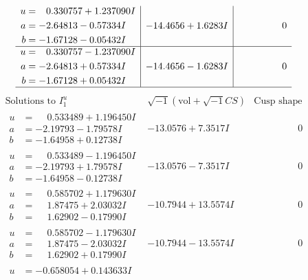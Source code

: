 \documentclass[1p]{elsarticle_modified}
\theoremstyle{definition}
\newcommand{\I}{\sqrt{-1}}
\begin{document}
$$\begin{array}{c|c|c}
\begin{aligned}
u &= \phantom{-}0.330757 + 1.237090 I \\
a &= -2.64813 - 0.57334 I \\
b &= -1.67128 - 0.05432 I\end{aligned}
 & -14.4656 + 1.6283 I & \phantom{-0.000000 } 0 \\ \hline\begin{aligned}
u &= \phantom{-}0.330757 - 1.237090 I \\
a &= -2.64813 + 0.57334 I \\
b &= -1.67128 + 0.05432 I\end{aligned}
 & -14.4656 - 1.6283 I & \phantom{-0.000000 } 0\\
 \hline 
 \end{array}$$\newpage$$\begin{array}{c|c|c}  
\text{Solutions to }I^u_{1}& \I (\text{vol} + \sqrt{-1}CS) & \text{Cusp shape}\\
 \hline 
\begin{aligned}
u &= \phantom{-}0.533489 + 1.196450 I \\
a &= -2.19793 - 1.79578 I \\
b &= -1.64958 + 0.12738 I\end{aligned}
 & -13.0576 + 7.3517 I & \phantom{-0.000000 } 0 \\ \hline\begin{aligned}
u &= \phantom{-}0.533489 - 1.196450 I \\
a &= -2.19793 + 1.79578 I \\
b &= -1.64958 - 0.12738 I\end{aligned}
 & -13.0576 - 7.3517 I & \phantom{-0.000000 } 0 \\ \hline\begin{aligned}
u &= \phantom{-}0.585702 + 1.179630 I \\
a &= \phantom{-}1.87475 + 2.03032 I \\
b &= \phantom{-}1.62902 - 0.17990 I\end{aligned}
 & -10.7944 + 13.5574 I & \phantom{-0.000000 } 0 \\ \hline\begin{aligned}
u &= \phantom{-}0.585702 - 1.179630 I \\
a &= \phantom{-}1.87475 - 2.03032 I \\
b &= \phantom{-}1.62902 + 0.17990 I\end{aligned}
 & -10.7944 - 13.5574 I & \phantom{-0.000000 } 0 \\ \hline\begin{aligned}
u &= -0.658054 + 0.143633 I \\

\end{aligned}
\end{array}$$
\end{document}
